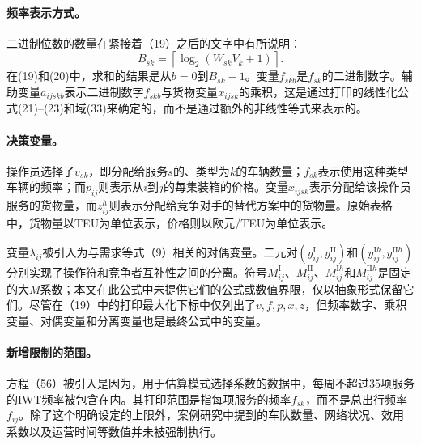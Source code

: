 \documentclass{article}
\begin{document}
\paragraph{频率表示方式。}
二进制位数的数量在紧接着（19）之后的文字中有所说明：
\[
B_{sk}=\left\lceil\log_2(W_{sk}V_k+1)\right\rceil.
\]
在(19)和(20)中，求和的结果是从\(b=0\)到\(B_{sk}-1\)。变量\(f_{skb}\)是\(f_{sk}\)的二进制数字。辅助变量\(a_{ijskb}\)表示二进制数字\(f_{skb}\)与货物变量\(x_{ijsk}\)的乘积，这是通过打印的线性化公式(21)--(23)和域(33)来确定的，而不是通过额外的非线性等式来表示的。

\paragraph{决策变量。}
操作员选择了\(v_{sk}\)，即分配给服务\(s\)的、类型为\(k\)的车辆数量；\(f_{sk}\)表示使用这种类型车辆的频率；而\(p_{ij}\)则表示从\(i\)到\(j\)的每集装箱的价格。变量\(x_{ijsk}\)表示分配给该操作员服务的货物量，而\(z_{ij}^{h}\)则表示分配给竞争对手的替代方案中的货物量。原始表格中，货物量以TEU为单位表示，价格则以欧元/TEU为单位表示。

变量\(\lambda_{ij}\)被引入为与需求等式（9）相关的对偶变量。二元对\((y_{ij}^{\mathrm I},y_{ij}^{\mathrm{II}})\)和\((y_{ij}^{\mathrm I h},y_{ij}^{\mathrm{II}h})\)分别实现了操作符和竞争者互补性之间的分离。符号\(M_{ij}^{\mathrm I}\)、\(M_{ij}^{\mathrm{II}}\)、\(M_{ij}^{\mathrm I h}\)和\(M_{ij}^{\mathrm{II}h}\)是固定的大\(M\)系数；本文在此公式中未提供它们的公式或数值界限，仅以抽象形式保留它们。尽管在（19）中的打印最大化下标中仅列出了\(v,f,p,x,z\)，但频率数字、乘积变量、对偶变量和分离变量也是最终公式中的变量。

\paragraph{新增限制的范围。}
方程（56）被引入是因为，用于估算模式选择系数的数据中，每周不超过35项服务的IWT频率被包含在内。其打印范围是指每项服务的频率\(f_{sk}\)，而不是总出行频率\(f_{ij}\)。除了这个明确设定的上限外，案例研究中提到的车队数量、网络状况、效用系数以及运营时间等数值并未被强制执行。
\end{document}
